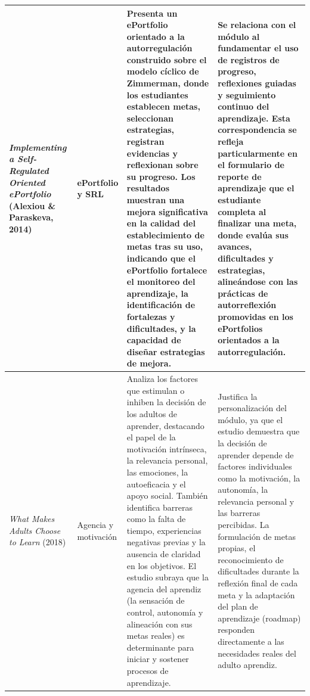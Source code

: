 \begin{center}
\begin{longtable}{| m{4.2cm} | m{3cm} | m{4.5cm} | m{4.5cm} |}
    \textit{Implementing a Self-Regulated Oriented ePortfolio} (Alexiou \& Paraskeva, 2014) \cite{alexiou_paraskeva_2014_eportfolio}&
    ePortfolio y SRL &
    Presenta un ePortfolio orientado a la autorregulación construido sobre el modelo cíclico de Zimmerman, donde los estudiantes establecen metas, seleccionan estrategias, registran evidencias y reflexionan sobre su progreso. Los resultados muestran una mejora significativa en la calidad del establecimiento de metas tras su uso, indicando que el ePortfolio fortalece el monitoreo del aprendizaje, la identificación de fortalezas y dificultades, y la capacidad de diseñar estrategias de mejora. &
    Se relaciona con el módulo al fundamentar el uso de registros de progreso, reflexiones guiadas y seguimiento continuo del aprendizaje. Esta correspondencia se refleja particularmente en el formulario de reporte de aprendizaje que el estudiante completa al finalizar una meta, donde evalúa sus avances, dificultades y estrategias, alineándose con las prácticas de autorreflexión promovidas en los ePortfolios orientados a la autorregulación. \\
    \hline
    
    \textit{What Makes Adults Choose to Learn} (2018) \cite{broek_etal_2023_adults_choose}&
    Agencia y motivación &
    Analiza los factores que estimulan o inhiben la decisión de los adultos de aprender, destacando el papel de la motivación intrínseca, la relevancia personal, las emociones, la autoeficacia y el apoyo social. También identifica barreras como la falta de tiempo, experiencias negativas previas y la ausencia de claridad en los objetivos. El estudio subraya que la agencia del aprendiz (la sensación de control, autonomía y alineación con sus metas reales) es determinante para iniciar y sostener procesos de aprendizaje. &
    Justifica la personalización del módulo, ya que el estudio demuestra que la decisión de aprender depende de factores individuales como la motivación, la autonomía, la relevancia personal y las barreras percibidas. La formulación de metas propias, el reconocimiento de dificultades durante la reflexión final de cada meta y la adaptación del plan de aprendizaje (roadmap) responden directamente a las necesidades reales del adulto aprendiz. \\
    \hline
    

\end{longtable}
\end{center}
